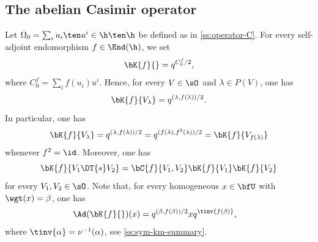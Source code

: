 \documentclass[reqno]{amsart}
\numberwithin{equation}{section}
\begin{document}
\subsection{The abelian Casimir operator}\label{ss:Casimir}
Let $\Omega_0=\sum_iu_i\ten u^i\in\h\ten\h$ be defined as in \ref{ss:operator-C}.
For every self-adjoint endomorphism $f\in\End(\h)$,
we set
\begin{equation}\label{eq:operator-k}
\bK{f}{}=q^{C^f_0/2},
\end{equation}
where $C^f_0=\sum_if(u_i)u^i$. Hence, for every $V\in\sO$ and $\lambda\in P(V)$, one has
\begin{equation}
\bK{f}{V_\lambda}=q^{(\lambda,f(\lambda))/2}.	
\end{equation}
In particular, one has
\begin{align}\label{eq:operator-k-twisted}
\bK{f}{V_{\lambda}}=q^{(\lambda, f(\lambda))/2}=q^{(f(\lambda), f^2(\lambda))/2}=\bK{f}{V_{f(\lambda)}}
\end{align}
whenever $f^2=\id$.
Moreover, one has
\begin{equation}
\label{eq:coproduct-operator-k}
	\bK{f}{V_1\DT{s}V_2}=\bC{f}{V_1,V_2}\bK{f}{V_1}\bK{f}{V_2}
\end{equation}
for every $V_1,V_2\in\sO$.
Note that, for every homogeneous $x\in\bfU$ with $\wgt(x)=\beta$, 
one has 
\begin{align}
\label{eq:adjoint-operator-k}
\Ad(\bK{f}{})(x)&=q^{(\beta,f(\beta))/2}xq^{\tinv{f(\beta)}},
\end{align}
where $\tinv{\alpha}=\nu^{-1}(\alpha)$, see \ref{ss:sym-km-summary}.

\end{document}
